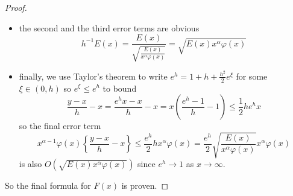 \documentclass[12pt]{article}
\begin{document}
\begin{proof}
\begin{itemize}
\item the second and the third error terms are obvious
$$h^{-1} E(x) = \frac{E(x)}{\sqrt{\frac{E(x)}{x^\alpha \varphi(x)}}} = \sqrt{E(x) x^\alpha \varphi(x)}$$

\item finally, we use Taylor's theorem to write $e^h = 1 + h + \frac{h^2}{2} e^\xi$ for some $\xi \in (0, h)$ so $e^\xi \leq e^h$ to bound
$$\frac{y - x}{h} - x = \frac{e^h x - x}{h} - x = x\left( \frac{e^h - 1}{h} - 1 \right) \leq \frac{1}{2} h e^h x$$
so the final error term
$$x^{\alpha - 1} \varphi(x) \left\{\frac{y - x}{h} - x \right\} \leq \frac{e^h}{2} h x^\alpha \varphi(x) = \frac{e^h}{2} \sqrt{\frac{E(x)}{x^\alpha \varphi(x)}} x^\alpha \varphi(x)$$
is also $O(\sqrt{E(x) x^\alpha \varphi(x)})$ since $e^h \rightarrow 1$ as $x \rightarrow \infty$.
\end{itemize}

So the final formula for $F(x)$ is proven.
\end{proof}

\unless\ifdefined\IsMainDocument
\end{document}
